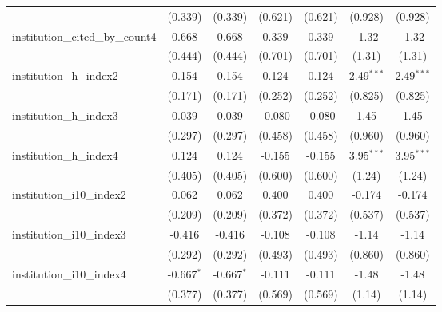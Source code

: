 \begin{tabular}{lcccccc}
                                         & (0.339)       & (0.339)       & (0.621)       & (0.621)       & (0.928)      & (0.928)\\   
   institution\_cited\_by\_count4        & 0.668         & 0.668         & 0.339         & 0.339         & -1.32        & -1.32\\   
                                         & (0.444)       & (0.444)       & (0.701)       & (0.701)       & (1.31)       & (1.31)\\   
   institution\_h\_index2                & 0.154         & 0.154         & 0.124         & 0.124         & 2.49$^{***}$ & 2.49$^{***}$\\   
                                         & (0.171)       & (0.171)       & (0.252)       & (0.252)       & (0.825)      & (0.825)\\   
   institution\_h\_index3                & 0.039         & 0.039         & -0.080        & -0.080        & 1.45         & 1.45\\   
                                         & (0.297)       & (0.297)       & (0.458)       & (0.458)       & (0.960)      & (0.960)\\   
   institution\_h\_index4                & 0.124         & 0.124         & -0.155        & -0.155        & 3.95$^{***}$ & 3.95$^{***}$\\   
                                         & (0.405)       & (0.405)       & (0.600)       & (0.600)       & (1.24)       & (1.24)\\   
   institution\_i10\_index2              & 0.062         & 0.062         & 0.400         & 0.400         & -0.174       & -0.174\\   
                                         & (0.209)       & (0.209)       & (0.372)       & (0.372)       & (0.537)      & (0.537)\\   
   institution\_i10\_index3              & -0.416        & -0.416        & -0.108        & -0.108        & -1.14        & -1.14\\   
                                         & (0.292)       & (0.292)       & (0.493)       & (0.493)       & (0.860)      & (0.860)\\   
   institution\_i10\_index4              & -0.667$^{*}$  & -0.667$^{*}$  & -0.111        & -0.111        & -1.48        & -1.48\\   
                                         & (0.377)       & (0.377)       & (0.569)       & (0.569)       & (1.14)       & (1.14)\\   

\end{tabular}
